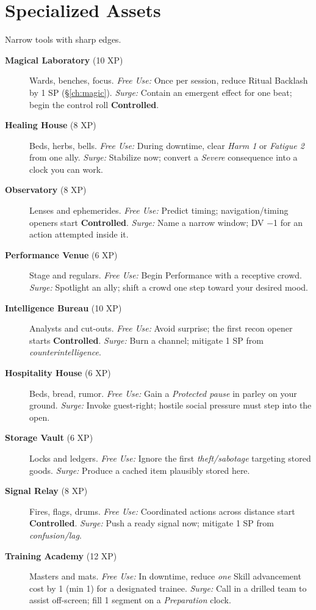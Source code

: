 \section{Specialized Assets}
Narrow tools with sharp edges.
\begin{description}
  \item[\textbf{Magical Laboratory} (10 XP)]  Wards, benches, focus. \emph{Free Use:} Once per session, reduce Ritual Backlash by 1 SP (\S\ref{ch:magic}). \emph{Surge:} Contain an emergent effect for one beat; begin the control roll \textbf{Controlled}.
  \item[\textbf{Healing House} (8 XP)]  Beds, herbs, bells. \emph{Free Use:} During downtime, clear \emph{Harm 1} or \emph{Fatigue 2} from one ally. \emph{Surge:} Stabilize now; convert a \emph{Severe} consequence into a clock you can work.
  \item[\textbf{Observatory} (8 XP)]  Lenses and ephemerides. \emph{Free Use:} Predict timing; navigation/timing openers start \textbf{Controlled}. \emph{Surge:} Name a narrow window; DV −1 for an action attempted inside it.
  \item[\textbf{Performance Venue} (6 XP)]  Stage and regulars. \emph{Free Use:} Begin Performance with a receptive crowd. \emph{Surge:} Spotlight an ally; shift a crowd one step toward your desired mood.
  \item[\textbf{Intelligence Bureau} (10 XP)]  Analysts and cut-outs. \emph{Free Use:} Avoid surprise; the first recon opener starts \textbf{Controlled}. \emph{Surge:} Burn a channel; mitigate 1 SP from \emph{counterintelligence}.
  \item[\textbf{Hospitality House} (6 XP)]  Beds, bread, rumor. \emph{Free Use:} Gain a \emph{Protected pause} in parley on your ground. \emph{Surge:} Invoke guest-right; hostile social pressure must step into the open.
  \item[\textbf{Storage Vault} (6 XP)]  Locks and ledgers. \emph{Free Use:} Ignore the first \emph{theft/sabotage} targeting stored goods. \emph{Surge:} Produce a cached item plausibly stored here.
  \item[\textbf{Signal Relay} (8 XP)]  Fires, flags, drums. \emph{Free Use:} Coordinated actions across distance start \textbf{Controlled}. \emph{Surge:} Push a ready signal now; mitigate 1 SP from \emph{confusion/lag}.
  \item[\textbf{Training Academy} (12 XP)]  Masters and mats. \emph{Free Use:} In downtime, reduce \emph{one} Skill advancement cost by 1 (min 1) for a designated trainee. \emph{Surge:} Call in a drilled team to assist off-screen; fill 1 segment on a \emph{Preparation} clock.
\end{description}


